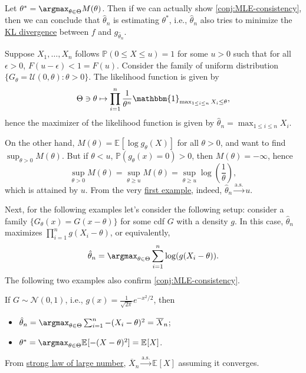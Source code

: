 Let \(\theta ^{\ast} = \argmax_{\theta \in \Theta } M(\theta )\). Then if we can actually show \autoref{conj:MLE-consistency}, then we can conclude that \(\hat{\theta} _n\) is estimating \(\theta ^{\ast} \), i.e., \(\hat{\theta} _n\) also tries to minimize the \href{https://en.wikipedia.org/wiki/Kullback%E2%80%93Leibler_divergence}{KL divergence} between \(f\) and \(g_{\hat{\theta} _n}\).

\begin{eg}\label{eg:supremum-estimation-MLE}
	Suppose \(X_1, \dots , X_n\) follows \(\mathbb{P} (0 \leq X \leq u) = 1\) for some \(u > 0\) such that for all \(\epsilon >0\), \(F(u - \epsilon ) < 1 = F(u)\). Consider the family of uniform distribution \(\{ G_\theta = \mathcal{U} (0, \theta ) \colon \theta > 0\} \). The likelihood function is given by
	\[
		\Theta \ni \theta
		\mapsto \prod_{i=1}^{n} \frac{1}{\theta ^n} \mathbbm{1}_{\max _{1 \leq i \leq n} X_i \leq \theta },
	\]
	hence the maximizer of the likelihood function is given by \(\hat{\theta} _n = \max _{1 \leq i \leq n} X_i\).

	On the other hand, \(M(\theta ) = \mathbb{E}_{}[\log g_\theta (X)] \) for all \(\theta  > 0\), and want to find \(\sup _{\theta > 0} M(\theta )\). But if \(\theta < u\), \(\mathbb{P} (g_\theta (x) = 0) > 0\), then \(M(\theta ) = -\infty \), hence
	\[
		\sup _{\theta > 0} M(\theta )
		= \sup _{\theta \geq u} M(\theta )
		= \sup _{\theta \geq u} \log (\frac{1}{\theta }),
	\]
	which is attained by \(u\). From the very \hyperref[eg:supremum-estimation]{first example}, indeed, \(\hat{\theta} _n \overset{\text{a.s.} }{\to} u\).
\end{eg}

Next, for the following examples let's consider the following setup: consider a family \(\{ G_\theta (x) = G(x - \theta ) \}\) for some cdf \(G\) with a density \(g\). In this case, \(\hat{\theta} _n\) maximizes \(\prod_{i=1}^{n} g(X_i - \theta )\), or equivalently,
\[
	\hat{\theta} _n
	= \argmax_{\theta \in \Theta } \sum_{i=1}^{n} \log (g(X_i - \theta )).
\]
The following two examples also confirm \autoref{conj:MLE-consistency}.

\begin{eg}[Normal]
	If \(G \sim \mathcal{N} (0, 1)\), i.e., \(g(x) = \frac{1}{\sqrt{2\pi } } e^{- x^2 / 2}\), then
	\begin{itemize}
		\item \(\hat{\theta} _n = \argmax_{\theta \in \Theta } \sum_{i=1}^{n} - (X_i - \theta )^2 = \overline{X} _n\);
		\item \(\theta ^{\ast} = \argmax_{\theta \in \Theta } \mathbb{E}_{}[-(X - \theta )^2] = \mathbb{E}_{}[X] \).
	\end{itemize}
	From \hyperref[thm:SLLN]{strong law of large number}, \(\overline{X} _n \overset{\text{a.s.} }{\to} \mathbb{E}_{}[X] \) assuming it converges.
\end{eg}

